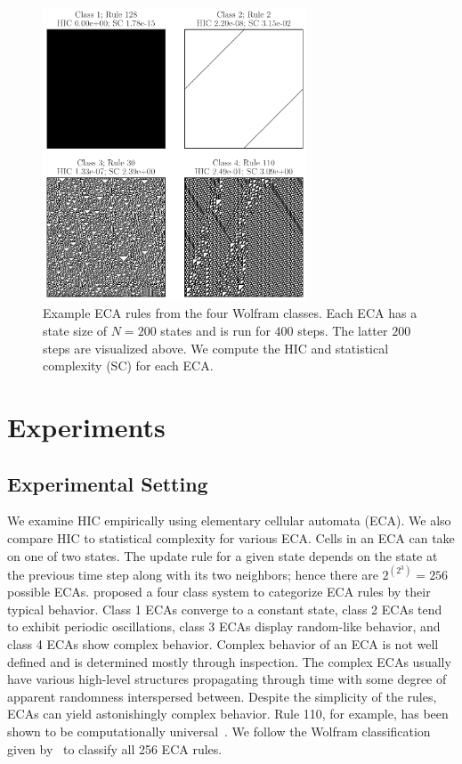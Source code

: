 \begin{figure}[ht]
\centering
\includegraphics[width=0.7\textwidth]{figures/eca_images_and_complexity}
\caption{Example ECA rules from the four Wolfram classes. Each ECA has a state
    size of $N=200$ states and is run for $400$ steps. The latter $200$ steps
    are visualized above. We compute the HIC and statistical complexity (SC)
    for each ECA.}
\label{fig:eca_images_and_complexity}
\end{figure}

\section{Experiments}

\subsection{Experimental Setting}

We examine HIC empirically using elementary cellular automata (ECA). We also
compare HIC to statistical complexity for various ECA. Cells in an ECA
can take on one of two states. The update rule for a given state depends on the
state at the previous time step along with its two neighbors; hence there are
$2^{(2^3)} = 256$ possible ECAs. \citet{wolfram1983} proposed a four class
system to categorize ECA rules by their typical behavior. Class 1 ECAs converge
to a constant state, class 2 ECAs tend to exhibit periodic oscillations, class
3 ECAs display random-like behavior, and class 4 ECAs show complex behavior.
Complex behavior of an ECA is not well defined and is determined mostly through
inspection. The complex ECAs usually have various high-level structures
propagating through time with some degree of apparent randomness interspersed
between. Despite the simplicity of the rules, ECAs can yield astonishingly
complex behavior. Rule 110, for example, has been shown to be computationally
universal~\citep{cook2004universality}. We follow the Wolfram classification
given by~\citet[table 2]{martinez2013note} to classify all 256 ECA rules.

